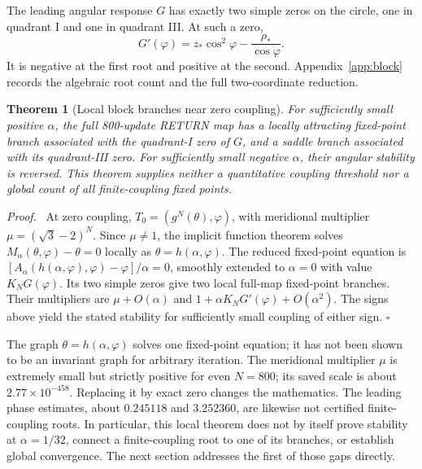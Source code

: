 \documentclass[11pt,a4paper]{article}
\newenvironment{proof}{\par\noindent\textit{Proof.}\ }{\hfill$\square$\par}
\newtheorem{theorem}{Theorem}[section]
\numberwithin{equation}{section}
\begin{document}
The leading angular response $G$ has exactly two simple zeros on the circle, one in quadrant I and one in quadrant III. At such a zero,
\begin{equation}\label{eq:rootderivative}
G'(\varphi)=z_*\cos^2\varphi-\frac{\rho_*}{\cos\varphi}.
\end{equation}
It is negative at the first root and positive at the second. Appendix~\ref{app:block} records the algebraic root count and the full two-coordinate reduction.

\begin{theorem}[Local block branches near zero coupling]\label{thm:smallalpha}
For sufficiently small positive $\alpha$, the full 800-update RETURN map has a locally attracting fixed-point branch associated with the quadrant-I zero of $G$, and a saddle branch associated with its quadrant-III zero. For sufficiently small negative $\alpha$, their angular stability is reversed. This theorem supplies neither a quantitative coupling threshold nor a global count of all finite-coupling fixed points.
\end{theorem}
\begin{proof}
At zero coupling, $T_0=(g^N(\theta),\varphi)$, with meridional multiplier $\mu=(\sqrt3-2)^N$. Since $\mu\ne1$, the implicit function theorem solves $M_\alpha(\theta,\varphi)-\theta=0$ locally as $\theta=h(\alpha,\varphi)$. The reduced fixed-point equation is $[A_\alpha(h(\alpha,\varphi),\varphi)-\varphi]/\alpha=0$, smoothly extended to $\alpha=0$ with value $K_NG(\varphi)$. Its two simple zeros give two local full-map fixed-point branches. Their multipliers are $\mu+O(\alpha)$ and $1+\alpha K_NG'(\varphi)+O(\alpha^2)$. The signs above yield the stated stability for sufficiently small coupling of either sign.
\end{proof}

The graph $\theta=h(\alpha,\varphi)$ solves one fixed-point equation; it has not been shown to be an invariant graph for arbitrary iteration. The meridional multiplier $\mu$ is extremely small but strictly positive for even $N=800$; its saved scale is about $2.77\times10^{-458}$. Replacing it by exact zero changes the mathematics. The leading phase estimates, about $0.245118$ and $3.252360$, are likewise not certified finite-coupling roots. In particular, this local theorem does not by itself prove stability at $\alpha=1/32$, connect a finite-coupling root to one of its branches, or establish global convergence. The next section addresses the first of those gaps directly.
\end{document}
